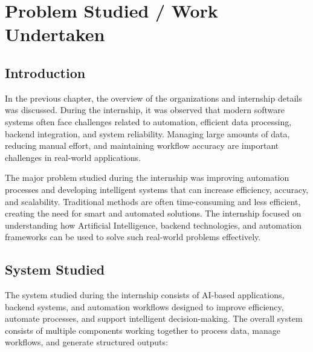 \documentclass[12pt,a4paper]{report}
\begin{document}
\chapter{Problem Studied / Work Undertaken}

\section{Introduction}

In the previous chapter, the overview of the organizations and internship details was discussed. During the internship, it was observed that modern software systems often face challenges related to automation, efficient data processing, backend integration, and system reliability. Managing large amounts of data, reducing manual effort, and maintaining workflow accuracy are important challenges in real-world applications.

The major problem studied during the internship was improving automation processes and developing intelligent systems that can increase efficiency, accuracy, and scalability. Traditional methods are often time-consuming and less efficient, creating the need for smart and automated solutions. The internship focused on understanding how Artificial Intelligence, backend technologies, and automation frameworks can be used to solve such real-world problems effectively.

\section{System Studied}

The system studied during the internship consists of AI-based applications, backend systems, and automation workflows designed to improve efficiency, automate processes, and support intelligent decision-making. The overall system consists of multiple components working together to process data, manage workflows, and generate structured outputs:
\end{document}

